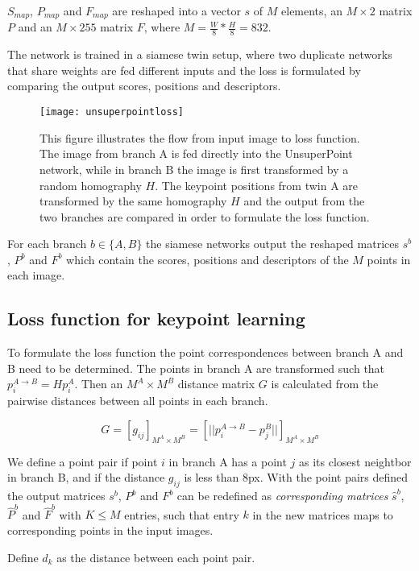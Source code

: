 $S_{map}$, $P_{map}$ and $F_{map}$ are reshaped into a vector $s$ of $M$ elements, an $M\times 2$ matrix $P$ and an $M\times 255$ matrix $F$, where $M=\frac{W}{8}*\frac{H}{8}=832$.

The network is trained in a siamese twin setup, where two duplicate networks that share weights are fed different inputs and the loss is formulated by comparing the output scores, positions and descriptors.

\begin{figure}[H]
	\centering
	\texttt{[image: unsuperpointloss]}
	\caption{This figure illustrates the flow from input image to loss function. The image from branch A is fed directly into the UnsuperPoint network, while in branch B the image is first transformed by a random homography $H$. The keypoint positions from twin A are transformed by the same homography $H$ and the output from the two branches are compared in order to formulate the loss function.}
	\label{fig:unsuperpointloss}
\end{figure}

For each branch $b\in\{A,B\}$ the siamese networks output the reshaped matrices $s^b$, $P^b$ and $F^b$ which contain the scores, positions and descriptors of the $M$ points in each image.

\subsection{Loss function for keypoint learning}

To formulate the loss function the point correspondences between branch A and B need to be determined. The points in branch A are transformed such that $p_i^{A\rightarrow B}=Hp_i^A$. Then an $M^A\times M^B$ distance matrix $G$ is calculated from the pairwise distances between all points in each branch.

\[
G=[g_{ij}]_{M^A\times M^B}=\left[||p_i^{A\rightarrow B}-p_j^B||\right]_{M^A\times M^B}
\]

We define a point pair if point $i$ in branch A has a point $j$ as its closest neightbor in branch B, and if the distance $g_{ij}$ is less than 8px. With the point pairs defined the output matrices $s^b$, $P^b$ and $F^b$ can be redefined as \textit{corresponding matrices} $\hat{s}^b$, $\hat{P}^b$ and $\hat{F}^b$ with $K\le M$ entries, such that entry $k$ in the new matrices maps to corresponding points in the input images.

Define $d_k$ as the distance between each point pair.

